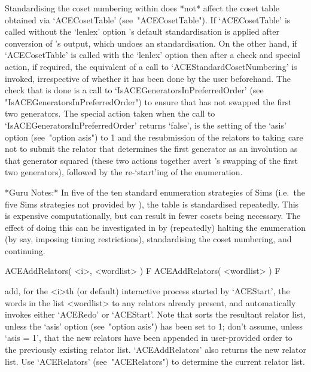 Standardising the coset numbering within {\ACE} does *not* affect  the
{\GAP} coset table obtained via `ACECosetTable' (see~"ACECosetTable").
If `ACECosetTable' is called  without  the  `lenlex'  option  {\GAP}'s
default  standardisation  is  applied  after  conversion  of  {\ACE}'s
output, which undoes an {\ACE} standardisation. On the other hand,  if
`ACECosetTable' is called with the `lenlex' option then after a  check
and  special  action,  if  required,  the  equivalent  of  a  call  to
`ACEStandardCosetNumbering' is invoked, irrespective of whether it has
been done by the user beforehand. The check that is done is a call  to
`IsACEGeneratorsInPreferredOrder'                                 (see
"IsACEGeneratorsInPreferredOrder")  to  ensure  that  {\ACE}  has  not
swapped the first two generators. The special action  taken  when  the
call to  `IsACEGeneratorsInPreferredOrder'  returns  `false',  is  the
setting of  the  `asis'  option  (see~"option  asis")  to  1  and  the
resubmission of the relators to {\ACE} taking care not to  submit  the
relator that determines the first generator as an involution  as  that
generator squared (these two actions together avert {\ACE}'s  swapping
of the first two generators), followed by  the  re-`start'ing  of  the
enumeration.

*Guru Notes:*
In  five  of  the  ten  standard  enumeration   strategies   of   Sims
\cite{Sim94} (i.e.~the five Sims strategies not provided  by  {\ACE}),
the   table   is   standardised   repeatedly.   This   is    expensive
computationally, but can result in fewer cosets being  necessary.  The
effect of doing this can be investigated  in  {\ACE}  by  (repeatedly)
halting  the  enumeration  (by  say,  imposing  timing  restrictions),
standardising the coset numbering, and continuing.

\>ACEAddRelators( <i>, <wordlist> ) F
\>ACEAddRelators( <wordlist> ) F

add, for the <i>th (or default) interactive {\ACE} process started  by
`ACEStart', the words in the list <wordlist> to any  relators  already
present, and automatically invokes  either  `ACERedo'  or  `ACEStart'.
Note that {\ACE} sorts the resultant relator list, unless  the  `asis'
option (see~"option asis") has been set to  1;  don't  assume,  unless
`asis = 1', that the new relators have been appended in  user-provided
order to the previously existing relator list.  `ACEAddRelators'  also
returns the new relator list. Use `ACERelators' (see~"ACERelators") to
determine the current relator list.

